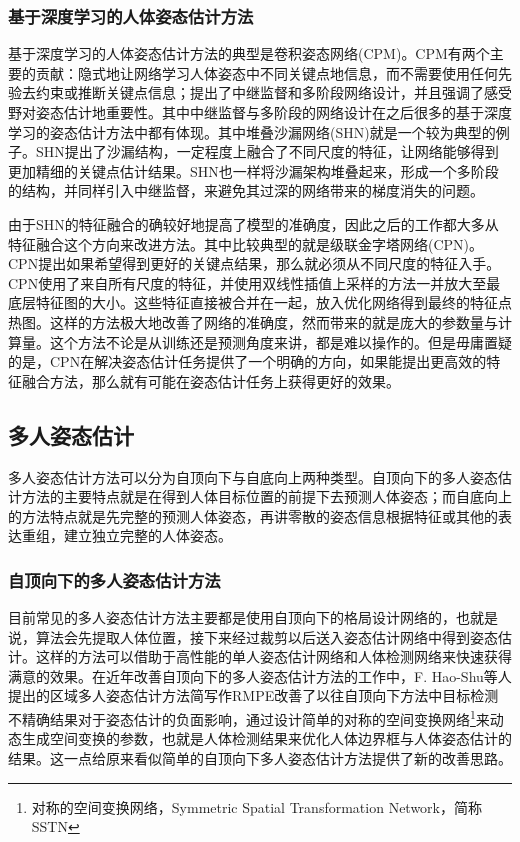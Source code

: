 \subsubsection{基于深度学习的人体姿态估计方法}
\label{subsubsec:deeppose}
基于深度学习的人体姿态估计方法的典型是卷积姿态网络(CPM)\cite{wei2016convolutional}。CPM有两个主要的贡献：隐式地让网络学习人体姿态中不同关键点地信息，而不需要使用任何先验去约束或推断关键点信息；提出了中继监督和多阶段网络设计，并且强调了感受野对姿态估计地重要性。其中中继监督与多阶段的网络设计在之后很多的基于深度学习的姿态估计方法中都有体现。其中堆叠沙漏网络(SHN)\cite{newell2016stacked}就是一个较为典型的例子。SHN提出了沙漏结构，一定程度上融合了不同尺度的特征，让网络能够得到更加精细的关键点估计结果。SHN也一样将沙漏架构堆叠起来，形成一个多阶段的结构，并同样引入中继监督，来避免其过深的网络带来的梯度消失的问题。

由于SHN的特征融合的确较好地提高了模型的准确度，因此之后的工作都大多从特征融合这个方向来改进方法。其中比较典型的就是级联金字塔网络(CPN)\cite{Chen2017Cascaded}。CPN提出如果希望得到更好的关键点结果，那么就必须从不同尺度的特征入手。CPN使用了来自所有尺度的特征，并使用双线性插值上采样的方法一并放大至最底层特征图的大小。这些特征直接被合并在一起，放入优化网络得到最终的特征点热图。这样的方法极大地改善了网络的准确度，然而带来的就是庞大的参数量与计算量。这个方法不论是从训练还是预测角度来讲，都是难以操作的。但是毋庸置疑的是，CPN在解决姿态估计任务提供了一个明确的方向，如果能提出更高效的特征融合方法，那么就有可能在姿态估计任务上获得更好的效果。

\subsection{多人姿态估计}
\label{subsubsec:multipose}
多人姿态估计方法可以分为自顶向下与自底向上两种类型。自顶向下的多人姿态估计方法的主要特点就是在得到人体目标位置的前提下去预测人体姿态；而自底向上的方法特点就是先完整的预测人体姿态，再讲零散的姿态信息根据特征或其他的表达重组，建立独立完整的人体姿态。
\subsubsection{自顶向下的多人姿态估计方法}
\label{subsubsec:topdownpose}
目前常见的多人姿态估计方法主要都是使用自顶向下的格局设计网络的，也就是说，算法会先提取人体位置，接下来经过裁剪以后送入姿态估计网络中得到姿态估计。这样的方法可以借助于高性能的单人姿态估计网络和人体检测网络来快速获得满意的效果。在近年改善自顶向下的多人姿态估计方法的工作中，F. Hao-Shu等人提出的区域多人姿态估计方法简写作RMPE\cite{fang2017rmpe}改善了以往自顶向下方法中目标检测不精确结果对于姿态估计的负面影响，通过设计简单的对称的空间变换网络\footnote{对称的空间变换网络，Symmetric Spatial Transformation Network，简称SSTN}来动态生成空间变换的参数，也就是人体检测结果来优化人体边界框与人体姿态估计的结果。这一点给原来看似简单的自顶向下多人姿态估计方法提供了新的改善思路。

